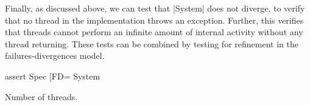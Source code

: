 Finally, as discussed above, we can test that |System| does not diverge, to
verify that no thread in the implementation throws an exception.  Further,
this verifies that threads cannot perform an infinite amount of internal
activity without any thread returning.  These tests can be combined by testing
for refinement in the failures-divergences model.
%
\begin{cspm}
assert Spec [FD= System
\end{cspm}

\framebox{**} Number of threads.
